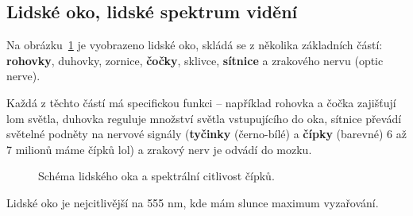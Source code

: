 \documentclass[a4paper, 12pt]{article}
\begin{document}
        \subsection{Lidské oko, lidské spektrum vidění}
            Na obrázku~\ref{fig:human_eye} je vyobrazeno lidské oko, skládá se z 
        několika základních částí: \textbf{rohovky}, duhovky, zornice, \textbf{čočky}, sklivce, 
        \textbf{sítnice} a zrakového nervu (optic nerve). 
        
        Každá z těchto částí má specifickou funkci – například rohovka 
        a čočka zajišťují lom světla, duhovka reguluje množství světla vstupujícího do oka, sítnice převádí světelné
        podněty na nervové signály (\textbf{tyčinky} (černo-bílé) a \textbf{čípky} (barevné) 6 až 7 milionů máme čípků lol) a zrakový nerv je odvádí do mozku. 

        \begin{figure}[H]
            \centering
            \begin{minipage}[t]{0.48\textwidth}
                \centering
                {\fontsize{5pt}{6pt}\selectfont 
                
                }
                \caption{Schéma lidského oka s popisem základních částí. Zdroj obrázku: \cite{wikimedia_eye}}
            \end{minipage}\hfill
            \begin{minipage}[t]{0.48\textwidth}
                \centering
                {\fontsize{5pt}{6pt}\selectfont 
                
                }
                \caption*{Spektrální citlivost čípků v lidském oku. Zdroj obrázku: \cite{wikimedia_spectrum}}
            \end{minipage}
            \caption{Schéma lidského oka a spektrální citlivost čípků.}
            \label{fig:human_eye}
        \end{figure}

        Lidské oko je nejcitlivější na 555 nm, kde mám slunce maximum vyzařování.
        
        \newpage
\end{document}

